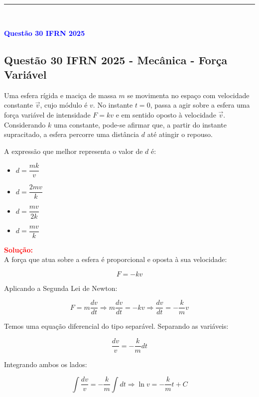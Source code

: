 \documentclass[a4paper,12pt]{article}
\begin{document}
\noindent\rule{\linewidth}{0.6pt}\\


\begin{flushleft}
\textbf{\textcolor{blue}{\Large Quest\~ao 30 IFRN 2025}}\\
\noindent
\subsection{Quest\~ao 30 IFRN 2025 - Mecânica - For\c{c}a Vari\'avel}

Uma esfera r\'igida e maci\c{c}a de massa \( m \) se movimenta no espa\c{c}o com 
velocidade constante \( \vec{v} \), cujo m\'odulo \'e \( v \). No instante \( t = 0 \), 
passa a agir sobre a esfera uma for\c{c}a vari\'avel de intensidade \( F = kv \) e em 
sentido oposto \`a velocidade \( \vec{v} \). Considerando \( k \) uma constante, 
pode-se afirmar que, a partir do instante supracitado, a esfera percorre uma dist\^ancia 
\( d \) at\'e atingir o repouso.

A express\~ao que melhor representa o valor de \( d \) \'e:

\begin{itemize}
    \item[(A)] \( d = \dfrac{mk}{v} \)
    \item[(B)] \( d = \dfrac{2mv}{k} \)
    \item[(C)] \( d = \dfrac{mv}{2k} \)
    \item[(D)] \( d = \dfrac{mv}{k} \)
\end{itemize}

\vspace{0.5cm}

\textcolor{red}{\textbf{Solução:}}\\

A for\c{c}a que atua sobre a esfera \'e proporcional e oposta \`a sua velocidade:

\[
F = -kv
\]

Aplicando a Segunda Lei de Newton:

\[
F = m \frac{dv}{dt} \Rightarrow m \frac{dv}{dt} = -kv
\Rightarrow \frac{dv}{dt} = -\frac{k}{m} v
\]

Temos uma equa\c{c}\~ao diferencial do tipo separ\'avel. Separando as vari\'aveis:

\[
\frac{dv}{v} = -\frac{k}{m} dt
\]

Integrando ambos os lados:

\[
\int \frac{dv}{v} = -\frac{k}{m} \int dt
\Rightarrow \ln v = -\frac{k}{m}t + C
\]


\end{flushleft}
\end{document}
